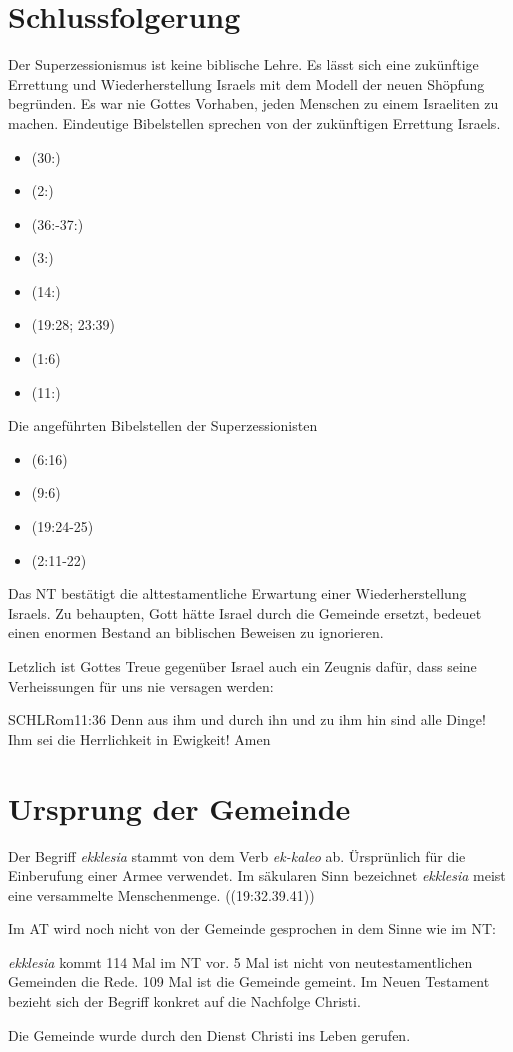 \documentclass[fontsize=14pt]{../../inc/mybib}
\begin{document}
\section{Schlussfolgerung}
Der Superzessionismus ist keine biblische Lehre. Es lässt sich eine zukünftige Errettung und Wiederherstellung Israels mit dem Modell der neuen Shöpfung begründen. Es war nie Gottes Vorhaben, jeden Menschen zu einem Israeliten zu machen. Eindeutige Bibelstellen sprechen von der zukünftigen Errettung Israels.
\begin{itemize}
    \item {}(30:)
    \item {}(2:)
    \item {}(36:-37:)
    \item {}(3:)
    \item {}(14:)
    \item {}(19:28; 23:39)
    \item {}(1:6)
    \item {}(11:)
\end{itemize}
Die angeführten Bibelstellen der Superzessionisten
\begin{itemize}
    \item {}(6:16)
    \item {}(9:6)
    \item {}(19:24-25)
    \item {}(2:11-22)
\end{itemize}
Das NT bestätigt die alttestamentliche Erwartung einer Wiederherstellung Israels. Zu behaupten, Gott hätte Israel durch die Gemeinde ersetzt, bedeuet einen enormen Bestand an biblischen Beweisen zu ignorieren.

Letzlich ist Gottes Treue gegenüber Israel auch ein Zeugnis dafür, dass seine Verheissungen für uns nie versagen werden:
\begin{bibelbox}{SCHL}{Rom}{11:36}
    Denn aus ihm und durch ihn und zu ihm hin sind alle Dinge! Ihm sei die Herrlichkeit in Ewigkeit! Amen
\end{bibelbox}
\section{Ursprung der Gemeinde}
Der Begriff \textit{ekklesia} stammt von dem Verb \textit{ek-kaleo} ab. Ürsprünlich für die Einberufung einer Armee verwendet. Im säkularen Sinn bezeichnet \textit{ekklesia} meist eine versammelte Menschenmenge. ((19:32.39.41))

Im AT wird noch nicht von der Gemeinde gesprochen in dem Sinne wie im NT:

\textit{ekklesia} kommt 114 Mal im NT vor. 5 Mal ist nicht von neutestamentlichen Gemeinden die Rede. 109 Mal ist die Gemeinde gemeint. Im Neuen Testament bezieht sich der Begriff konkret auf die Nachfolge Christi.

Die Gemeinde wurde durch den Dienst Christi ins Leben gerufen.
\end{document}

